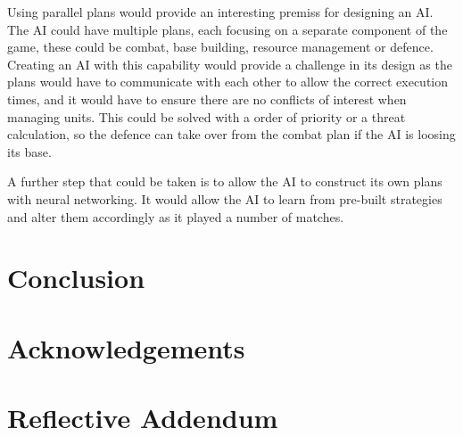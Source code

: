\documentclass[journal]{IEEEtran}
\begin{document}
Using parallel plans would provide an interesting premiss for designing an AI. The AI could have multiple plans, each focusing on a separate component of the game, these could be combat, base building, resource management or defence. Creating an AI with this capability would provide a challenge in its design as the plans would have to communicate with each other to allow the correct execution times, and it would have to ensure there are no conflicts of interest when managing units. This could be solved with a order of priority or a threat calculation, so the defence can take over from the combat plan if the AI is loosing its base.

A further step that could be taken is to allow the AI to construct its own plans with neural networking. It would allow the AI to learn from pre-built strategies and alter them accordingly as it played a number of matches.

\section{Conclusion}
\section{Acknowledgements}





\section{Reflective Addendum}
\end{document}
